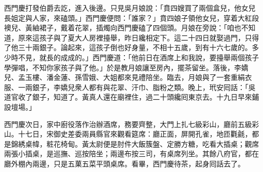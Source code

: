 西門慶打發伯爵去訖，進入後邊。只見吳月娘說：「賁四嫂買了兩個盒兒，他女兒長姐定與人家，來磕頭。」西門慶便問：「誰家？」賁四娘子領他女兒，穿着大紅段襖兒、黃紬裙子，戴着花翠，插燭向西門慶磕了四個頭。月娘在旁說：「咱也不知道，原來這孩子與了夏大人房裡擡舉，昨日纔相定下。{}這二十四日就娶過門，只得了他三十兩銀子。論起來，這孩子倒也好身量，不相十五歲，到有十六七歲的。多少時不見，就長的成成的。」西門慶道：「他前日在酒席上和我說，要擡舉兩個孩子學彈唱，不知你家孩子與了他。」於是教月娘讓至房內，擺茶留坐。落後，李嬌兒、孟玉樓、潘金蓮、孫雪娥、大姐都來見禮陪坐。臨去，月娘與了一套重絹衣服、一兩銀子，李嬌兒衆人都有與花翠、汗巾、脂粉之類。晚上，玳安囘話：「吳道官收了銀子，知道了。黃真人還在廟裡住，過二十頭纔囘東京去。十九日早來鋪設壇場。」

西門慶次日，家中廚役落作治辦酒席，務要齊整，大門上扎七級彩山，廳前五級彩山。十七日，宋御史差委兩員縣官來觀看筵席：廳正面，屏開孔雀，地匝氍毹，都是錦綉桌幃，粧花椅甸。黃太尉便是肘件大飯簇盤、定勝方糖，吃看大插桌；觀席兩張小插桌，是巡撫、巡按陪坐；兩邊布按三司，有桌席列坐。其餘八府官，都在廳外棚內兩邊，只是五菓五菜平頭桌席。看畢，西門慶待茶，起身囘話去了。

